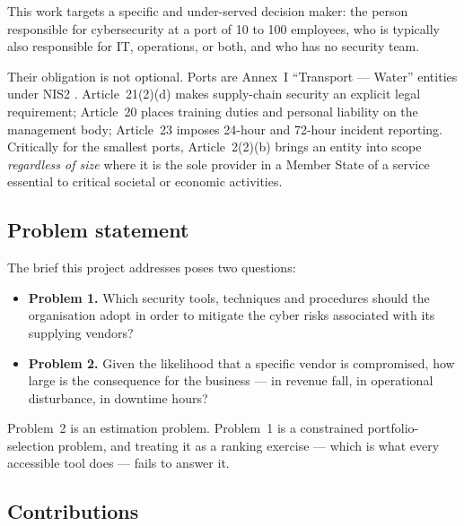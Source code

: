 \documentclass[conference]{IEEEtran}
\begin{document}
This work targets a specific and under-served decision maker: the person
responsible for cybersecurity at a port of 10 to 100 employees, who is typically
also responsible for IT, operations, or both, and who has no security team.

Their obligation is not optional. Ports are Annex~I ``Transport --- Water''
entities under NIS2 \cite{nis2}. Article~21(2)(d) makes supply-chain security an
explicit legal requirement; Article~20 places training duties and personal
liability on the management body; Article~23 imposes 24-hour and 72-hour incident
reporting. Critically for the smallest ports, Article~2(2)(b) brings an entity into
scope \emph{regardless of size} where it is the sole provider in a Member State of
a service essential to critical societal or economic activities.

\subsection{Problem statement}

The brief this project addresses poses two questions:

\begin{itemize}
\item \textbf{Problem 1.} Which security tools, techniques and procedures should
the organisation adopt in order to mitigate the cyber risks associated with its
supplying vendors?
\item \textbf{Problem 2.} Given the likelihood that a specific vendor is
compromised, how large is the consequence for the business --- in revenue fall,
in operational disturbance, in downtime hours?
\end{itemize}

Problem~2 is an estimation problem. Problem~1 is a constrained portfolio-selection
problem, and treating it as a ranking exercise --- which is what every accessible
tool does --- fails to answer it.

\subsection{Contributions}
\end{document}
